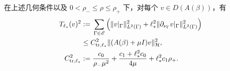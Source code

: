 \begin{proposition}[全界面正移位迹估计]
  \label{prop:positive-shift-trace-bound}
  在上述几何条件以及 $0<\rho_-\leq\rho\leq\rho_+$ 下，对每个
  $v\in D(A(\beta))$，有
  \begin{align}
    T_{\ell_*}(v)^2
    &:={}
    \sum_{\Gamma\in\mathscr E}
    \left(
      \lVert v|_\Gamma\rVert_{L^2(\Gamma)}^2
      +\ell_*^2
       \lVert\partial_{\nu_\Gamma}v|_\Gamma\rVert_{L^2(\Gamma)}^2
    \right)
    \notag\\
    &\leq C_{\mathrm{tr},\ell_*}^2
      \lVert(A(\beta)+\mu I)v\rVert_{\mathcal H}^2,
    \label{eq:positive-shift-trace-bound}\\
    C_{\mathrm{tr},\ell_*}^2
    &:={}
    \frac{c_0}{\rho_-\mu^2}
    +\frac{c_1+\ell_*^2c_0}{4\mu}
    +\ell_*^2c_1\rho_+.
    \label{eq:trace-constant}
  \end{align}
\end{proposition}

